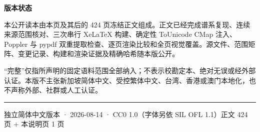\documentclass[11pt]{article}
\begin{document}
\vspace{0.85cm}
{\sffamily\bfseries\color{navy}版本状态}\par\vspace{0.35em}
本公开读本由本页及其后的 424 页冻结正文组成。正文已经完成谱系复现、连续来源范围核对、三次串行 XeLaTeX 构建、确定性 ToUnicode CMap 注入、Poppler 与 pypdf 双重提取检查、逐页渲染比较和全页视觉覆盖。源文件、范围矩阵、变更记录、构建和渲染证据及精确哈希随本版公开。

\vspace{0.45cm}
“完整”仅指所声明的固定语料范围全部纳入；不表示校勘定本、绝对无误或经外部认证。本版不主张新加坡简体中文、受控繁体中文、台湾、香港或澳门本地化，也不声称外部、社群或人工认证。

\vfill
\color{gold}\rule{\textwidth}{0.8pt}\par
\vspace{0.25cm}
{\small\color{ink}独立简体中文版本 · 2026-08-14 · CC0 1.0（字体另依 SIL OFL 1.1）\hfill 正文 424 页 + 本说明页 1 页}
\end{document}
